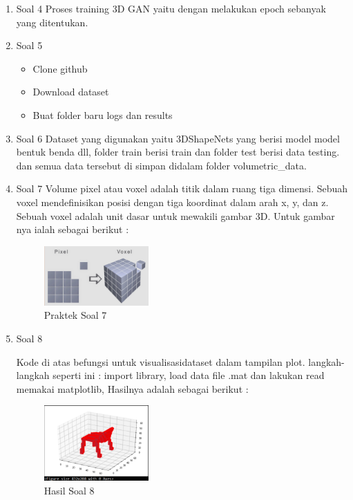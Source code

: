 \begin{enumerate}
	\item Soal 4
	\hfill\break
	Proses training 3D GAN yaitu dengan melakukan epoch sebanyak yang ditentukan.

	\item Soal 5
	\hfill\break
	\begin{itemize}
		\item Clone github
		\item Download dataset
		\item Buat folder baru logs dan results
	\end{itemize}

	\item Soal 6
	\hfill\break
	Dataset yang digunakan yaitu 3DShapeNets yang berisi model model bentuk benda dll, folder train berisi train dan folder test berisi data testing. dan semua data tersebut di simpan didalam folder volumetric\_data.

	\item Soal 7
	\hfill\break
	Volume pixel atau voxel adalah titik dalam ruang tiga dimensi. Sebuah voxel mendefinisikan posisi dengan tiga koordinat dalam arah x, y, dan z. Sebuah voxel adalah unit dasar untuk mewakili gambar 3D. Untuk gambar nya ialah sebagai berikut :
	\begin{figure}[H]
	\centering
		\includegraphics[width=4cm]{figures/1174012/chapter8/praktek7.PNG}
		\caption{Praktek Soal 7}
	\end{figure}

	\item Soal 8
	\hfill\break
	
	Kode di atas befungsi untuk visualisasidataset dalam tampilan plot. langkah-langkah seperti ini :
	import library, load data file .mat dan lakukan read memakai matplotlib, Hasilnya adalah sebagai berikut :
	\begin{figure}[H]
	\centering
		\includegraphics[width=4cm]{figures/1174012/chapter8/praktek8.PNG}
		\caption{Hasil Soal 8}
	\end{figure}


\end{enumerate}
